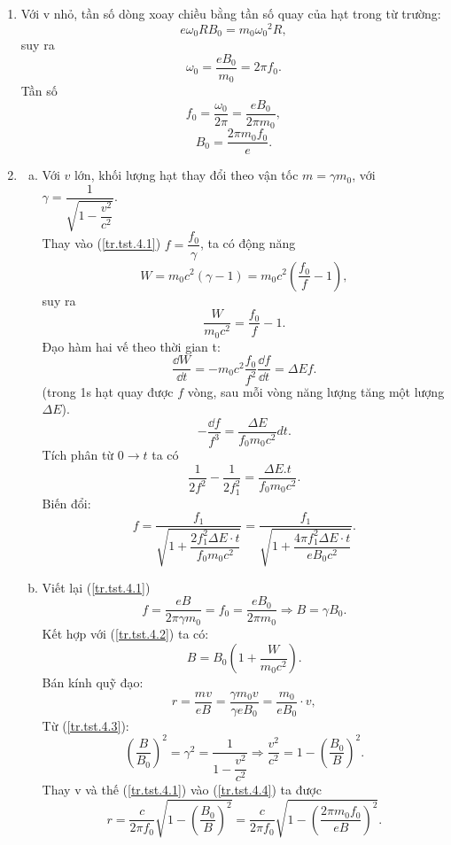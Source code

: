 \begin{loigiai}
    \begin{enumerate}[1)]
        \item Với v nhỏ, tần số dòng xoay chiều bằng tần số quay của hạt trong từ trường: 
        \[e{{\omega }_{0}}R{{B}_{0}}={{m}_{0}}{{\omega }_{0}}^{2}R,\] suy ra \[{{\omega }_{0}}=\dfrac{e{{B}_{0}}}{{{m}_{0}}}=2\pi {{f}_{0}}.\] Tần số \[{{f}_{0}}=\dfrac{{{\omega }_{0}}}{2\pi }=\dfrac{e{{B}_{0}}}{2\pi {{m}_{0}}}, \tag{1} \label{tr.tst.4.1}\] 
        \[{{B}_{0}}=\dfrac{2\pi {{m}_{0}}{{f}_{0}}}{e}.\]
        \item \begin{enumerate}[a)]
            \item Với $v$ lớn, khối lượng hạt thay đổi theo vận tốc $m=\gamma {{m}_{0}}$, với $\gamma =\dfrac{1}{\sqrt{1-\dfrac{{{v}^{2}}}{{{c}^{2}}}}}.$
            \\Thay vào (\ref{tr.tst.4.1}) $f=\dfrac{{{f}_{0}}}{\gamma }$, ta có động năng 
            \[W={{m}_{0}}{{c}^{2}}(\gamma -1)={{m}_{0}}{{c}^{2}}\left( \dfrac{{{f}_{0}}}{f}-1 \right), \tag{2} \label{tr.tst.4.2}\] 
            suy ra \[\dfrac{W}{{{m}_{0}}{{c}^{2}}}=\dfrac{{{f}_{0}}}{f}-1.\] 
            Đạo hàm hai vế theo thời gian t: \[\dfrac{\dd W}{{\dd t}}=-{{m}_{0}}{{c}^{2}}\dfrac{{{f}_{0}}}{{{f}^{2}}}\dfrac{{\dd f}}{{\dd t}}=\Delta Ef.\] (trong 1s hạt quay được $f$ vòng,  sau mỗi vòng năng lượng tăng một lượng $\Delta E$). 
            \[-\dfrac{\dd f}{{{{f}}^{{3}}}}=\dfrac{\Delta {E}}{{{f}_{0}}{{m}_{0}}{{c}^{2}}}dt.\] Tích phân từ $0\to t$ ta có \[\dfrac{1}{2{{f}^{2}}}-\dfrac{1}{2f_{1}^{2}}=\dfrac{\Delta {E}.t}{{{f}_{0}}{{m}_{0}}{{c}^{2}}}.\]
            Biến đổi: \[f=\dfrac{{{f}_{1}}}{\sqrt{1+\dfrac{2f_{1}^{2}\Delta E\cdot t}{{{f}_{0}}{{m}_{0}}{{c}^{2}}}}}=\dfrac{{{f}_{1}}}{\sqrt{1+\dfrac{4\pi f_{1}^{2}\Delta E\cdot t}{e{{B}_{0}}{{c}^{2}}}}}.\]
            \item Viết lại (\ref{tr.tst.4.1}) \[f=\dfrac{eB}{2\pi \gamma {{m}_{0}}}={{f}_{0}}=\dfrac{e{{B}_{0}}}{2\pi {{m}_{0}}}\Rightarrow B=\gamma {{B}_{0}}. \tag{3} \label{tr.tst.4.3}\]
            Kết hợp với (\ref{tr.tst.4.2}) ta có: 
            \[B={{B}_{0}}\left( 1+\dfrac{W}{{{m}_{0}}{{c}^{2}}} \right).\]
            Bán kính quỹ đạo: \[r=\dfrac{mv}{eB}=\dfrac{\gamma {{m}_{0}}v}{\gamma e{{B}_{0}}}=\dfrac{{{m}_{0}}}{e{{B}_{0}}}\cdot v, \tag{4} \label{tr.tst.4.4} \]
            Từ (\ref{tr.tst.4.3}): \[{{\left( \dfrac{B}{{{B}_{0}}} \right)}^{2}}={{\gamma }^{2}}=\dfrac{1}{1-\dfrac{{{v}^{2}}}{{{c}^{2}}}}\Rightarrow \dfrac{{{v}^{2}}}{{{c}^{2}}}=1-{{\left( \dfrac{{{B}_{0}}}{B} \right)}^{2}}.\]
            Thay v và thế (\ref{tr.tst.4.1}) vào (\ref{tr.tst.4.4}) ta được  \[r=\dfrac{c}{2\pi {{f}_{0}}}\sqrt{1-{{\left( \dfrac{{{B}_{0}}}{B} \right)}^{2}}}=\dfrac{c}{2\pi {{f}_{0}}}\sqrt{1-{{\left( \dfrac{2\pi {{m}_{0}}{{f}_{0}}}{eB} \right)}^{2}}}.\]

        \end{enumerate}

    \end{enumerate}
\end{loigiai}


